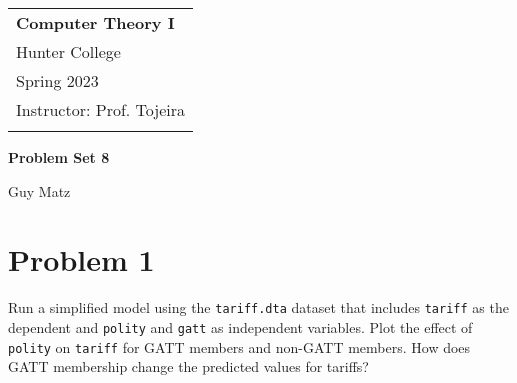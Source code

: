 \documentclass[11pt, a4paper]{article} %
\begin{document}

\setlength{\parindent}{0pt} %
\onehalfspacing				%


\begin{tabular}{p{15.5cm}}
      {\large \textbf{Computer Theory I}} \\
	Hunter College \\
    Spring 2023  \\
	Instructor: Prof. Tojeira\\
	\hline
	\\
\end{tabular}

\vspace*{0.3cm}				%


\begin{center}
	{\Large \textbf{Problem Set 8}}
	\vspace{2mm}

	Guy Matz

\end{center}

\vspace{0.4cm}

\section*{Problem 1}

Run a simplified model using the \texttt{tariff.dta} dataset that includes \texttt{tariff} as the dependent and \texttt{polity} and \texttt{gatt} as independent variables. Plot the effect of \texttt{polity} on \texttt{tariff} for GATT members and non-GATT members. How does GATT membership change the predicted values for tariffs?
\end{document}
